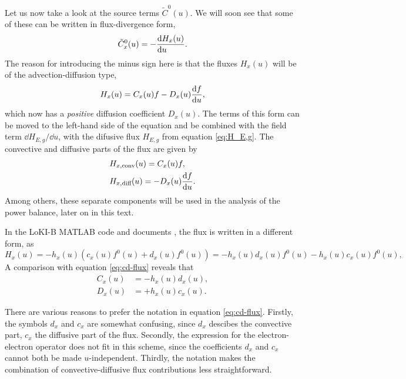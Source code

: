 \documentclass{book}
\begin{document}
Let us now take a look at the source terms $\tilde{C}^0(u)$. We will soon see
that some of these can be written in flux-divergence form,
\begin{equation}
	\tilde{C}^0_x(u) = -\DERIV{H_x(u)}{u}.
	\label{eq:Ctilde=-dH/du}
\end{equation}
The reason for introducing the minus sign here is that the fluxes $H_x(u)$ will
be of the advection-diffusion type,
\begin{equation}
	H_x(u) = C_x(u)f - D_x(u)\DERIV{f}{u},
	\label{eq:cd-flux}
\end{equation}
which now has a {\em positive} diffusion coefficient $D_x(u)$. The terms of this
form can be moved to the left-hand side of the equation and be combined with the
field term $\dd{H_{E,g}}/\dd{u}$, with the difusive flux $H_{E,g}$ from equation
\eqref{eq:H_E,g}.
The convective and diffusive parts of the flux are given by
\begin{align}
	&H_{x,\text{conv}}(u) = C_x(u)f,
	\label{eq:cd-flux-conv}
	\\
	&H_{x,\text{diff}}(u) = - D_x(u)\DERIV{f}{u}.
	\label{eq:cd-flux-diff}
\end{align}
Among others, these separate components will be used in the analysis of the
power balance, later on in this text.

In the LoKI-B MATLAB code and documents \cite[below 25a]{Manual_2_2_0}, the
flux is written in a different form, as
\begin{equation}
	H_x(u) = -h_x(u)\left(c_x(u) f^0(u) + d_x(u) f^0(u)\right)
	       = -h_x(u)d_x(u) f^0(u) - h_x(u)c_x(u) f^0(u),
	\label{eq:H_x(h_x,c_x,d_x)}
\end{equation}
A comparison with equation \eqref{eq:cd-flux} reveals that
\begin{align}
	C_x(u) &= -h_x(u)d_x(u), \label{eq:C_x(h_x,d_x)} \\
	D_x(u) &= +h_x(u)c_x(u). \label{eq:D_x(h_x,c_x)}
\end{align}

There are various reasons to prefer the notation in equation \eqref{eq:cd-flux}.
Firstly, the symbols $d_x$ and $c_x$ are somewhat confusing, since $d_x$
descibes the convective part, $c_x$ the diffusive part of the flux. Secondly,
the expression for the electron-electron operator does not fit in this scheme,
since the coefficients $d_x$ and $c_x$ cannot both be made $u$-independent.
Thirdly, the notation makes the combination of convective-diffusive flux
contributions less straightforward.
\end{document}
